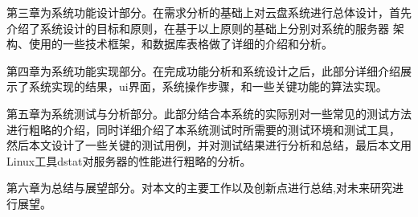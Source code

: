 第三章为系统功能设计部分。在需求分析的基础上对云盘系统进行总体设计，首先介绍了系统设计的目标和原则，在基于以上原则的基础上分别对系统的服务器
架构、使用的一些技术框架，和数据库表格做了详细的介绍和分析。

第四章为系统功能实现部分。在完成功能分析和系统设计之后，此部分详细介绍展示了系统实现的结果，ui界面，系统操作步骤，和一些关键功能的算法实现。

第五章为系统测试与分析部分。此部分结合本系统的实际别对一些常见的测试方法进行粗略的介绍，同时详细介绍了本系统测试时所需要的测试环境和测试工具，
然后本文设计了一些关键的测试用例，并对测试结果进行分析和总结，最后本文用Linux工具dstat对服务器的性能进行粗略的分析。

第六章为总结与展望部分。对本文的主要工作以及创新点进行总结,对未来研究进行展望。